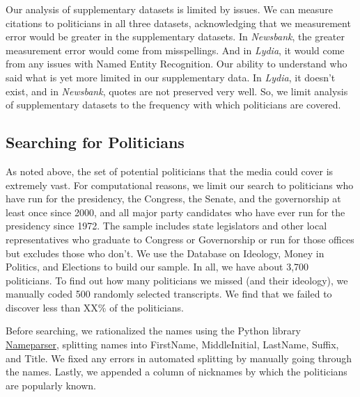 \documentclass[12pt, letterpaper]{article}
\begin{document}
Our analysis of supplementary datasets is limited by issues. We can measure citations to politicians in all three datasets, acknowledging that we measurement error would be greater in the supplementary datasets. In \textit{Newsbank}, the greater measurement error would come from misspellings. And in \textit{Lydia}, it would come from any issues with Named Entity Recognition. Our ability to understand who said what is yet more limited in our supplementary data. In \textit{Lydia}, it doesn't exist, and in \textit{Newsbank}, quotes are not preserved very well. So, we limit analysis of supplementary datasets to the frequency with which politicians are covered.

\subsection*{Searching for Politicians}
As noted above, the set of potential politicians that the media could cover is extremely vast. For computational reasons, we limit our search to politicians who have run for the presidency, the Congress, the Senate, and the governorship at least once since 2000, and all major party candidates who have ever run for the presidency since 1972. The sample includes state legislators and other local representatives who graduate to Congress or Governorship or run for those offices but excludes those who don't. We use the Database on Ideology, Money in Politics, and Elections \citep{bonica2013} to build our sample. In all, we have about 3,700 politicians. To find out how many politicians we missed (and their ideology), we manually coded 500 randomly selected transcripts. We find that we failed to discover less than XX\% of the politicians.

Before searching, we rationalized the names using the Python library \href{https://pypi.org/project/nameparser/}{Nameparser}, splitting names into FirstName, MiddleInitial, LastName, Suffix, and Title. We fixed any errors in automated splitting by manually going through the names. Lastly, we appended a column of nicknames by which the politicians are popularly known.
\end{document}
